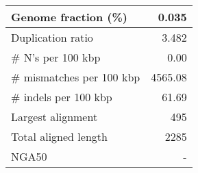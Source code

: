 \documentclass[12pt,a4paper]{article}
\begin{document}
\begin{table}[ht]
\begin{center}
\begin{tabular}{|l*{1}{|r}|}
Genome fraction (\%) & 0.035 \\ \hline
Duplication ratio & 3.482 \\ \hline
\# N's per 100 kbp & 0.00 \\ \hline
\# mismatches per 100 kbp & 4565.08 \\ \hline
\# indels per 100 kbp & 61.69 \\ \hline
Largest alignment & 495 \\ \hline
Total aligned length & 2285 \\ \hline
NGA50 & - \\ \hline
\end{tabular}
\end{center}
\end{table}
\end{document}
